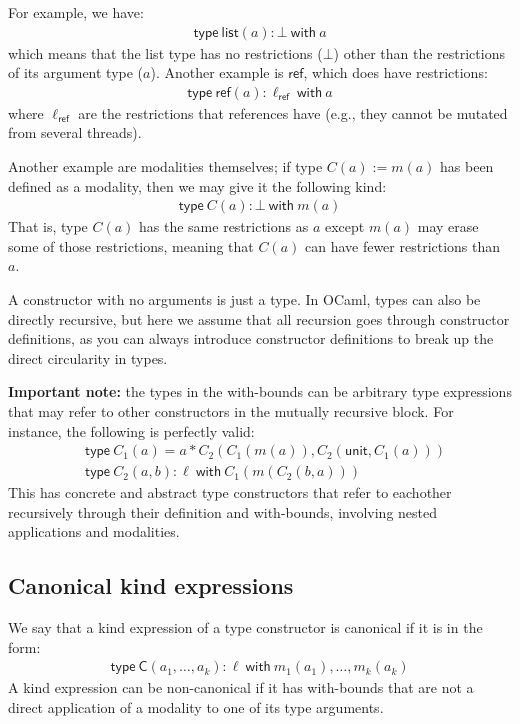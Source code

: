 \documentclass{article}
\begin{document}
For example, we have:
\begin{align*}
    \mathsf{type\ list}(a) : \bot \mathsf{\ with\ } a
\end{align*}
which means that the list type has no restrictions ($\bot$) other than the restrictions of its argument type ($a$).
Another example is $\mathsf{ref}$, which does have restrictions:
\begin{align*}
    \mathsf{type\ ref}(a) : \ell_{\mathsf{ref}} \mathsf{\ with\ } a
\end{align*}
where $\ell_{\mathsf{ref}}$ are the restrictions that references have (e.g., they cannot be mutated from several threads).

Another example are modalities themselves; if type $C(a) := m(a)$ has been defined as a modality, then we may give it the following kind:
\begin{align*}
    \mathsf{type\ } C(a) : \bot \mathsf{\ with\ } m(a)
\end{align*}
That is, type $C(a)$ has the same restrictions as $a$ except $m(a)$ may erase some of those restrictions, meaning that $C(a)$ can have fewer restrictions than $a$.

A constructor with no arguments is just a type. In OCaml, types can also be directly recursive, but here we assume that all recursion goes through constructor definitions, as you can always introduce constructor definitions to break up the direct circularity in types.

\textbf{Important note:} the types in the with-bounds can be arbitrary type expressions that may refer to other constructors in the mutually recursive block.
For instance, the following is perfectly valid:
\begin{align*}
    &\mathsf{type\ }C_1(a) = a \ast C_2(C_1(m(a)), C_2(\mathsf{unit}, C_1(a)))\\
    &\mathsf{type\ }C_2(a,b) : \ell \mathsf{\ with\ } C_1(m(C_2(b,a)))
\end{align*}
This has concrete and abstract type constructors that refer to eachother recursively through their definition and with-bounds, involving nested applications and modalities.

\subsection*{Canonical kind expressions}

We say that a kind expression of a type constructor is canonical if it is in the form:
\begin{align*}
    \mathsf{type\ C}(a_1, \dots, a_k) : \ell \mathsf{\ with\ } m_1(a_1),\dots,m_k(a_k)
\end{align*}
A kind expression can be non-canonical if it has with-bounds that are not a direct application of a modality to one of its type arguments.
\end{document}

